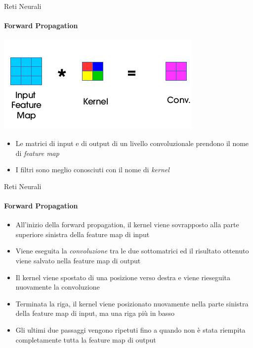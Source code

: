 \documentclass[
 ]{beamer}
\begin{document}
\begin{frame}{Reti Neurali}
    \framesubtitle{Forward Propagation} 
    
    \begin{center}
      \includegraphics[scale = 0.7]{forward_conv1.png}
    \end{center}
  
    \smallskip
    
    \begin{itemize} [<+->]
        \setlength\itemsep{2em}
        \item \large Le matrici di input e di output di un livello convoluzionale prendono il nome di \emph{feature map}
        \item \large I filtri sono meglio conosciuti con il nome di \emph{kernel}
    \end{itemize}
    
\end{frame}


\begin{frame}{Reti Neurali}
    \framesubtitle{Forward Propagation} 
    
    \begin{itemize} [<+->]
        \setlength\itemsep{1em}
        \item \large All'inizio della forward propagation, il kernel viene sovrapposto alla parte superiore sinistra della feature map di input
        \item \large Viene eseguita la \emph{convoluzione} tra le due sottomatrici ed il risultato ottenuto viene salvato nella feature map di output 
        \item \large Il kernel viene spostato di una posizione verso destra e viene rieseguita nuovamente la convoluzione  
        \item \large Terminata la riga, il kernel viene posizionato nuovamente nella parte sinistra della feature map di input, ma una riga più in basso
        \item \large Gli ultimi due passaggi vengono ripetuti fino a quando non è stata riempita completamente tutta la feature map di output
    \end{itemize}
\end{frame}
\end{document}
